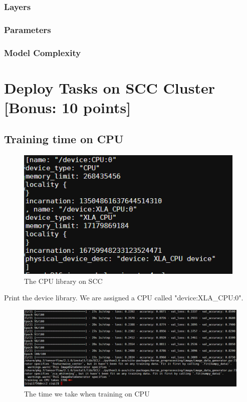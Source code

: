 \documentclass[a4paper,12pt]{article}
\begin{document}
\subsubsection{Layers}
\subsubsection{Parameters}
\subsubsection{Model Complexity}

\section{Deploy Tasks on SCC Cluster [Bonus: 10 points]}

\subsection{Training time on CPU}
\begin{figure}[H]
  \centering
  \includegraphics[width=11cm]{./images/CPU-lib.png}
     \caption{The CPU library on SCC}
        \label{CPU-lib}
\end{figure}

Print the device library. We are assigned a CPU called "device:XLA\_CPU:0".

\begin{figure}[H]
  \centering
  \includegraphics[width=15cm]{./images/CPU-Training-time.png}
     \caption{The time we take when training on CPU
             }
        \label{CPU-Training-time}
\end{figure}
\end{document}
